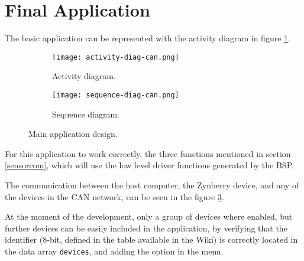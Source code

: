 

\section{Final Application}

The basic application can be represented with the activity diagram in figure \ref{fig:activity-diag-can}.

\begin{figure}[htp]
	\centering
	\begin{subfigure}{0.45\textwidth}
		\texttt{[image: activity-diag-can.png]}
		\caption{Activity diagram.} \label{fig:activity-diag-can}
	\end{subfigure} \hfill
	\begin{subfigure}{0.45\textwidth}
		\texttt{[image: sequence-diag-can.png]}
		\caption{Sequence diagram.} \label{fig:sequence-diag-can}
	\end{subfigure}%
	\caption{Main application design.}
\end{figure}%

For this application to work correctly, the three functions mentioned in section \ref{sensorcom}, which will use the low level driver functions generated by the BSP.

The communication between the host computer, the Zynberry device, and any of the devices in the CAN network, can be seen in the figure \ref{fig:sequence-diag-can}.

At the moment of the development, only a group of devices where enabled, but further devices can be easily included in the application, by verifying that the identifier (8-bit, defined in the table available in the Wiki) is correctly located in the data array \texttt{devices}, and adding the option in the menu.


